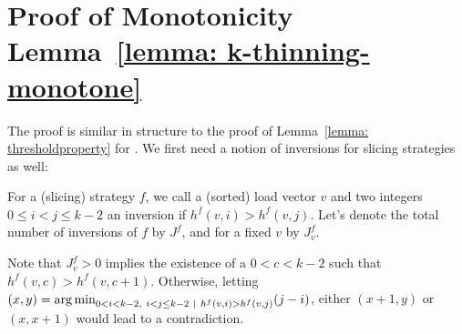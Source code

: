 \chapter{Proof of \KThinning Monotonicity Lemma~\ref{lemma: k-thinning-monotone}}\label{k-thinning-monotone-proof}



The proof is similar in structure to the proof of Lemma~\ref{lemma: thresholdproperty} for \TwoThinning. We first need a notion of inversions for \KThinning slicing strategies as well:


\begin{definition} 
For a (slicing) strategy $f$, we call a (sorted) load vector $v$ and two integers $0\leq i<j\leq k-2$ an inversion if $h^f(v,i)>h^f(v,j)$. Let's denote the total number of inversions of $f$ by $J^f$, and for a fixed $v$ by $J^f_v$.
\end{definition}

\begin{remark} 
Note that $J^f_v>0$ implies the existence of a $0<c<k-2$ such that $h^f(v,c)>h^f(v,c+1)$. Otherwise, letting $(x,y)=\argmin_{0<i<k-2,\ i<j\leq k-2\ \mid\ h^f(v,i)>h^f(v,j)} (j-i)$, either $(x+1,y)$ or $(x,x+1)$ would lead to a contradiction. 
\end{remark}


